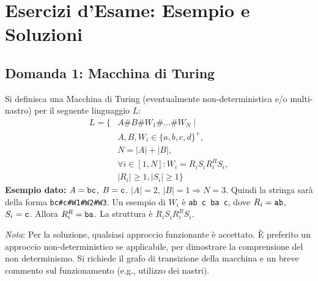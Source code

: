\documentclass[a4paper]{article}
\begin{document}
\section{Esercizi d'Esame: Esempio e Soluzioni}

\subsection{Domanda 1: Macchina di Turing}
Si definisca una Macchina di Turing (eventualmente non-deterministica e/o multi-nastro) per il seguente linguaggio $L$:
\begin{align*}
L = \{ & A \# B \# W_1 \# \dots \# W_N \mid \\
& A, B, W_i \in \{a,b,c,d\}^+, \\
& N = |A| + |B|, \\
& \forall i \in [1, N]: W_i = R_i S_i R_i^R S_i, \\
& |R_i| \ge 1, |S_i| \ge 1 \}
\end{align*}
\textbf{Esempio dato:} $A = \text{\texttt{bc}}$, $B = \text{\texttt{c}}$. $|A|=2$, $|B|=1 \Rightarrow N = 3$.
Quindi la stringa sarà della forma \texttt{bc\#c\#W1\#W2\#W3}.
Un esempio di $W_i$ è \texttt{ab c ba c}, dove $R_i=\text{\texttt{ab}}$, $S_i=\text{\texttt{c}}$. Allora $R_i^R = \text{\texttt{ba}}$. La struttura è $R_i S_i R_i^R S_i$.

\textit{Nota}: Per la soluzione, qualsiasi approccio funzionante è accettato. È preferito un approccio non-deterministico se applicabile, per dimostrare la comprensione del non determinismo. Si richiede il grafo di transizione della macchina e un breve commento sul funzionamento (e.g., utilizzo dei nastri).
\end{document}
